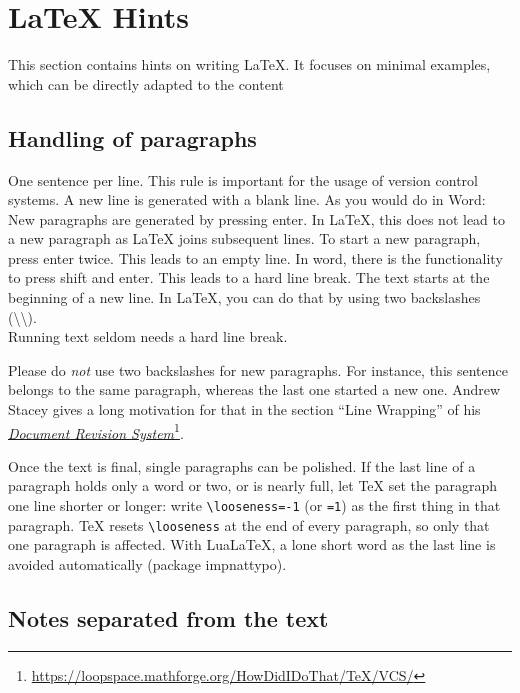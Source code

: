 \ifluatex
\fi

\section{LaTeX Hints}
\label{sec:latexhints}

This section contains hints on writing LaTeX.
It focuses on minimal examples, which can be directly adapted to the content

\subsection{Handling of paragraphs}

\begin{ltgexample}
One sentence per line.
This rule is important for the usage of version control systems.
A new line is generated with a blank line.
As you would do in Word:
New paragraphs are generated by pressing enter.
In LaTeX, this does not lead to a new paragraph as LaTeX joins subsequent lines.
To start a new paragraph, press enter twice.
This leads to an empty line.
In word, there is the functionality to press shift and enter.
This leads to a hard line break.
The text starts at the beginning of a new line.
In LaTeX, you can do that by using two backslashes (\textbackslash\textbackslash).
\\
Running text seldom needs a hard line break.

Please do \textit{not} use two backslashes for new paragraphs.
For instance, this sentence belongs to the same paragraph, whereas the last one started a new one.
Andrew Stacey gives a long motivation for that in the section \enquote{Line Wrapping} of his \href{https://loopspace.mathforge.org/HowDidIDoThat/TeX/VCS/#section.3}{\emph{Document Revision System}}\footnote{\url{https://loopspace.mathforge.org/HowDidIDoThat/TeX/VCS/}}.
\end{ltgexample}

Once the text is final, single paragraphs can be polished.
If the last line of a paragraph holds only a word or two, or is nearly full, let TeX set the paragraph one line shorter or longer: write \texttt{\textbackslash looseness=-1} (or \texttt{=1}) as the first thing in that paragraph.
TeX resets \texttt{\textbackslash looseness} at the end of every paragraph, so only that one paragraph is affected.
With LuaLaTeX, a lone short word as the last line is avoided automatically (package impnattypo).

\subsection{Notes separated from the text}

